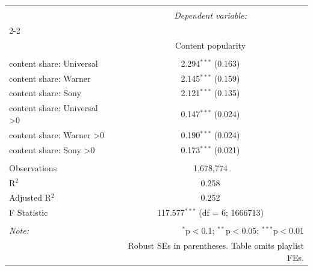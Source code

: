 \documentclass[8pt]{beamer}
\begin{document}
{\begin{table}[H] \centering 
\begingroup\fontsize{6pt}{7pt}\selectfont
\begin{tabular}{@{\extracolsep{1pt}}lc} 
\\[-1.8ex]\hline 
\hline \\[-1.8ex] 
 & \multicolumn{1}{c}{\textit{Dependent variable:}} \\ 
\cline{2-2} 
\\[-1.8ex] & Content popularity \\ 
\hline \\[-1.8ex] 
 content share: Universal & 2.294$^{***}$ (0.163) \\ 
  content share: Warner & 2.145$^{***}$ (0.159) \\ 
  content share: Sony & 2.121$^{***}$ (0.135) \\ 
  content share: Universal \textgreater  0 & 0.147$^{***}$ (0.024) \\ 
  content share: Warner \textgreater  0 & 0.190$^{***}$ (0.024) \\ 
  content share: Sony \textgreater  0 & 0.173$^{***}$ (0.021) \\ 
 \hline \\[-1.8ex] 
Observations & 1,678,774 \\
R$^{2}$ & 0.258 \\ 
Adjusted R$^{2}$ & 0.252 \\ 
F Statistic & 117.577$^{***}$ (df = 6; 1666713) \\ 
\hline 
\hline \\[-1.8ex] 
\textit{Note:}  & \multicolumn{1}{r}{$^{*}$p$<$0.1; $^{**}$p$<$0.05; $^{***}$p$<$0.01} \\ 
 & \multicolumn{1}{r}{Robust SEs in parentheses. Table omits playlist FEs.} \\ 
\end{tabular}
\endgroup
  \label{tab:pop_reg} 
\end{table}

}
\end{document}
